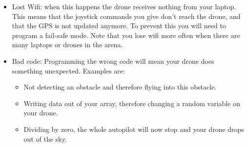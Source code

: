 \documentclass{article}
\begin{document}
\begin{itemize}
\item Lost Wifi: when this happens the drone receives nothing from your laptop. This means that the joystick commands you give don't reach the drone, and that the GPS is not updated anymore. To prevent this you will need to program a fail-safe mode. Note that you lose wifi more often when there are many laptops or drones in the arena. 
\item Bad code: Programming the wrong code will mean your drone does something unexpected. Examples are: 
\begin{itemize}
	\item Not detecting an obstacle and therefore flying into this obstacle. 
	\item Writing data out of your array, therefore changing a random variable on your drone. 
	\item Dividing by zero, the whole autopilot will now stop and your drone drops out of the sky. 
\end{itemize}
\end{itemize}
\end{document}
